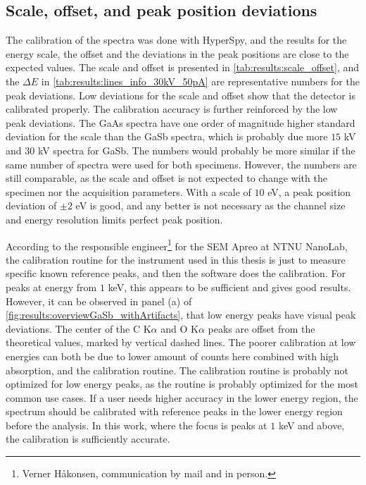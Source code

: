 \subsection{Scale, offset, and peak position deviations}
\label{discussion:scale_offset}

The calibration of the spectra was done with HyperSpy, and the results for the energy scale, the offset and the deviations in the peak positions are close to the expected values.
The scale and offset is presented in \cref{tab:results:scale_offset}, and the $\Delta E$ in \cref{tab:results:lines_info_30kV_50pA} are representative numbers for the peak deviations.
Low deviations for the scale and offset show that the detector is calibrated properly.
The calibration accuracy is further reinforced by the low peak deviations.
The GaAs spectra have one order of magnitude higher standard deviation for the scale than the GaSb spectra, which is probably due more $15$ kV and $30$ kV spectra for GaSb.
The numbers would probably be more similar if the same number of spectra were used for both specimens.
However, the numbers are still comparable, as the scale and offset is not expected to change with the specimen nor the acquisition parameters.
With a scale of $10$ eV, a peak position deviation of $\pm 2$ eV is good, and any better is not necessary as the channel size and energy resolution limits perfect peak position.

%
According to the responsible engineer\footnote{Verner Håkonsen, communication by mail and in person.} for the SEM Apreo at NTNU NanoLab, the calibration routine for the instrument used in this thesis is just to measure specific known reference peaks, and then the software does the calibration.
For peaks at energy from $1$ keV, this appears to be sufficient and gives good results.
However, it can be observed in panel (a) of \cref{fig:results:overviewGaSb_withArtifacts}, that low energy peaks have visual peak deviations.
The center of the C K$\alpha$ and O K$\alpha$ peaks are offset from the theoretical values, marked by vertical dashed lines.
The poorer calibration at low energies can both be due to lower amount of counts here combined with high absorption, and the calibration routine.
The calibration routine is probably not optimized for low energy peaks, as the routine is probably optimized for the most common use cases.
If a user needs higher accuracy in the lower energy region, the spectrum should be calibrated with reference peaks in the lower energy region before the analysis.
In this work, where the focus is peaks at $1$ keV and above, the calibration is sufficiently accurate.



